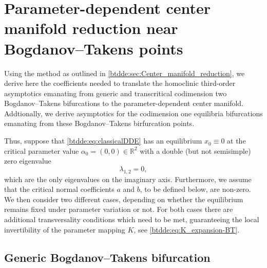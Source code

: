 % 

\section{Parameter-dependent center manifold reduction near Bogdanov--Takens points}
\label{btdde:sec:parameter-dependent-center-manifold-reduction} 
Using the method as outlined in \cref{btdde:sec:Center_manifold_reduction}, we derive
here the coefficients needed to translate the homoclinic third-order asymptotics
emanating from generic and transcritical codimension two Bogdanov--Takens
bifurcations to the parameter-dependent center manifold. Addtionally, we derive
asymptotics for the codimension one equilibria bifurcations emanating from these
Bogdanov--Takens birfurcation points.

Thus, suppose that \cref{btdde:eq:classicalDDE} has an equilibrium $x_0 \equiv 0$ at
the critical parameter value $\alpha_0 = (0,0) \in \mathbb R^2$ with a double
(but not semisimple) zero eigenvalue
\begin{equation}
    \lambda_{1,2} = 0,
\end{equation}
which are the only eigenvalues on the imaginary axis. Furthermore, we assume
that the critical normal coefficients $a$ and $b$, to be defined below, are
non-zero. We then consider two different cases, depending on whether the
equilibrium remains fixed under parameter variation or not. For both cases there
are additional transversality conditions which need to be met, guaranteeing the
local invertibility of the parameter mapping $K$, see \cref{btdde:eq:K_expansion-BT}.

\subsection{Generic Bogdanov--Takens bifurcation}
\label{btdde:sec:generic_bogdanov-takens}

